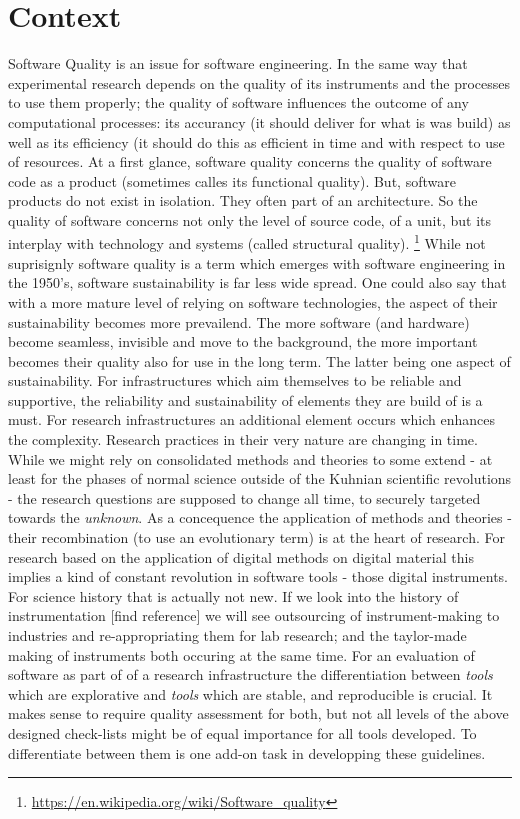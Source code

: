 \documentclass[a4paper,11pt]{article}
\begin{document}
\section{Context}
Software Quality is an issue for software engineering. In the same way that experimental research depends on the quality of its instruments and the processes to use them properly; the quality of software influences the outcome of any computational processes: its accurancy (it should deliver for what is was build) as well as its efficiency (it should do this as efficient in time and with respect to use of resources. At a first glance, software quality concerns the quality of software code as a product (sometimes calles its functional quality). But, software products do not exist in isolation. They often part of an architecture. So the quality of software concerns not only the level of source code, of a unit, but its interplay with technology and systems (called structural quality). \footnote{\url{https://en.wikipedia.org/wiki/Software_quality}}
While not suprisignly software quality is a term which emerges with software engineering in the 1950's, software sustainability is far less wide spread. One could also say that with a more mature level of relying on software technologies, the aspect of their sustainability becomes more prevailend. The more software (and hardware) become seamless, invisible and move to the background, the more important becomes their quality also for use in the long term. The latter being one aspect of sustainability.
For infrastructures which aim themselves to be reliable and supportive, the reliability and sustainability of elements they are build of is a must.
For research infrastructures an additional element occurs which enhances the complexity. Research practices in their very nature are changing in time. While we might rely on consolidated methods and theories to some extend - at least for the phases of normal science outside of the Kuhnian scientific revolutions - the research questions are supposed to change all time, to securely targeted towards the \textit{unknown}. As a concequence the application of methods and theories - their recombination (to use an evolutionary term) is at the heart of research. For research based on the application of digital methods on digital material this implies a kind of constant revolution in software tools - those digital instruments. 
For science history that is actually not new. If we look into the history of instrumentation [find reference] we will see outsourcing of instrument-making to industries and re-appropriating them for lab research; and the taylor-made making of instruments both occuring at the same time. 
For an evaluation of software as part of of a research infrastructure the differentiation between \textit{tools} which are explorative and \textit{tools} which are stable, and reproducible is crucial. It makes sense to require quality assessment for both, but not all levels of the above designed check-lists might be of equal importance for all tools developed. To differentiate between them is one add-on task in developping these guidelines. 
\end{document}
